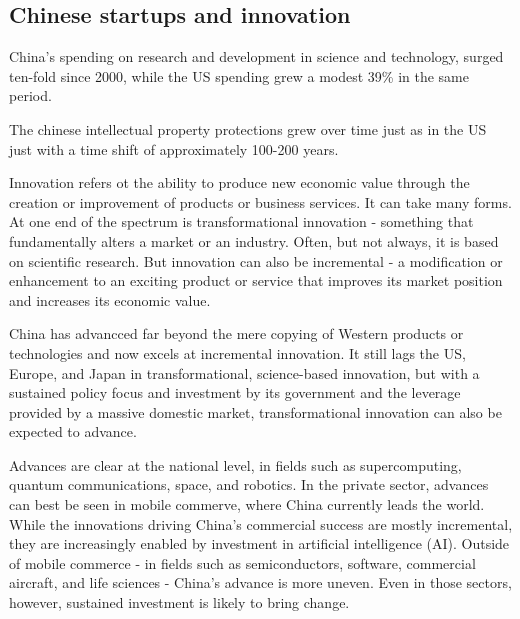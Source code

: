 \subsection{Chinese startups and innovation}

China's spending on research and development in science and technology,
surged ten-fold since 2000, while the US spending grew a modest 39\% in the
same period.

The chinese intellectual property protections grew over time just as in the
US just with a time shift of approximately 100-200 years.

\vspace{1\baselineskip}

Innovation refers ot the ability to produce new economic value through the
creation or improvement of products or business services. It can take many
forms. At one end of the spectrum is transformational innovation - something
that fundamentally alters a market or an industry. Often, but not always, it
is based on scientific research. But innovation can also be incremental - a
modification or enhancement to an exciting product or service that improves
its market position and increases its economic value.

\vspace{1\baselineskip}

China has advancced far beyond the mere copying of Western products or
technologies and now excels at incremental innovation. It still lags the US,
Europe, and Japan in transformational, science-based innovation, but with
a sustained policy focus and investment by its government and the leverage
provided by a massive domestic market, transformational innovation can also
be expected to advance.

\vspace{1\baselineskip}

Advances are clear at the national level, in fields such as supercomputing,
quantum communications, space, and robotics. In the private sector,
advances can best be seen in mobile commerve, where China currently leads the
world. While the innovations driving China's commercial success are mostly
incremental, they are increasingly enabled by investment in artificial
intelligence (AI). Outside of mobile commerce - in fields such as semiconductors,
software, commercial aircraft, and life sciences - China's advance is more
uneven. Even in those sectors, however, sustained investment is likely to
bring change.

